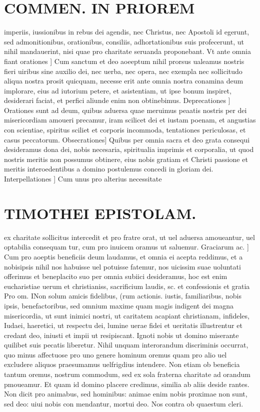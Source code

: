 \documentclass{article}
\begin{document}
\begin{pages}
\section*{COMMEN. IN PRIOREM }
\marginpar{[ p.42 ]}\pstart imperiis, iussionibus in rebus dei agendis, nec Christus, nec Apostoli id egerunt, sed admonitionibus, orationibus, consiliis, adhortationibus suis profecerunt, ut nihil mandauerint, nisi quae pro charitate seruanda proponebant.  \pend\pstart Vt ante omnia fiant orationes ] Cum sanctum et deo aoeeptum nihil prorsus ualeamus nostris fieri uiribus sine auxilio dei, nec uerba, nec opera, nec exempla nec sollicitudo aliqua nostra prosit quicquam, necesse erit ante omnia nostra conamina deum implorare, eius ad iutorium petere, et asistentiam, ut ipse bonum inspiret, desiderari faciat, et perfici aliunde enim non obtinebimus.  \pend\pstart Deprecationes ] Orationes sunt ad deum, quibus aduersa quae meruimus peaatis nostris per dei misericordiam amoueri precamur, iram scilicet dei et iustam poenam, et angustias con scientiae, spiritus sciliet et corporis incommoda, tentationes periculosas, et casus peccatorum.  \pend\pstart Obsecrationes] Quibus per omnia sacra et deo grata consequi desideramus dona dei, nobis necesaria, spiritualia imprimis et corporalia, ut quod nostris meritis non possumus obtinere, eius nobis gratiam et Christi passione et meritis interoedentibus a domino postulemus concedi in gloriam dei.  \pend\pstart Interpellationes ] Cum unus pro alterius necessitate  \pend
\section*{TIMOTHEI EPISTOLAM. }
\marginpar{[ p.45 ]}\pstart ex charitate sollicitus intercedit et pro fratre orat, ut uel aduersa amoueantur, uel optabilia consequam tur, cum pro inuicem oramus ut saluemur. Graciarum ac. ] Cum pro aoeptis beneficiis deum laudamus, et omnia ei acepta reddimus, et a nobisipsis nihil nos habuisse uel potuisse fatemur, nos uicissim suae uoluntati offerimus et beneplacito suo per omnia subiici desideramus, hoc est enim eucharistiae uerum et christianiss, sacrificium laudis, sc. et confessionis et gratia Pro om. INon solum amicis fidelibus, (rum actionis. iustis, familiaribus, nobis ipsis, benefactoribus, sed omnium maxime quam magis indigent dei magna misericordia, ut sunt inimici nostri, ut caritatem acapiant christianam, infideles, Iudaei, haeretici, ut respectu dei, lumine uerae fidei et ueritatis illustrentur et credant deo, iniusti et impii ut resipiscant. Ignoti nobis ut domino miserante quilibet suis pecatis liberetur. Nihil unquam interorandum discriminis occurrat, quo minus affectuose pro uno genere hominum oremus quam pro alio uel excludere aliquos praesumamus uelfrigdius intendere. Non etiam ob beneficia tantum oremus, nostrum commodum, sed ex sola fraterna charitate ad orandum pmoueamur. Et quam id domino placere credimus, similia ab aliis deside rantes. Non dicit pro animabus, sed hominibus: animae enim nobis proximae non sunt, sed deo: uiui nobis con mendantur, mortui deo. Nos contra ob quaestum cleri.  \pend

\end{pages}
\end{document}
